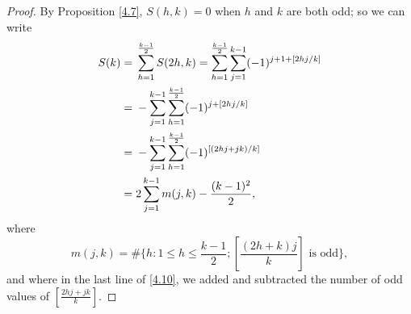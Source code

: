 \documentclass[11pt,reqno]{amsart}
\theoremstyle{plain}
\numberwithin{equation}{section}
\begin{document}
\begin{proof} By Proposition \ref{4.7}, $S(h,k) = 0$ when $h$ and $k$ are both odd; so we can write
\begin{align}\label{4.10}
S(k)=&\; \sum_{h=1}^{\frac{k-1}{2}}S(2h,k) = \sum_{h=1}^{\frac{k-1}{2}}\sum_{j=1}^{k-1}(-1)^{j+1+\left[2hj/k\right]}\notag\\
=&\;-\sum_{j=1}^{k-1}\sum_{h=1}^{\frac{k-1}{2}} (-1)^{j+\left[2hj/k\right]}\notag\\
=&\;-\sum_{j=1}^{k-1}\sum_{h=1}^{\frac{k-1}{2}} (-1)^{\left[(2hj+jk)/k\right]}\notag\\
=&\; 2 \sum_{j=1}^{k-1}m(j,k) - \frac{(k-1)^2}{2},
\end{align}
where
\begin{equation}\label{m}
m(j,k) = \#\biggl\{h: 1\leq h \leq \dfrac{k-1}{2};\left[\dfrac{(2h+k)j}{k}\right]\text{ is odd}\biggr\},
\end{equation}
and where in the last line of \eqref{4.10}, we added and subtracted the number of odd values of $\left[\frac{2hj+jk}{k}\right]$.


\end{proof}
\end{document}
